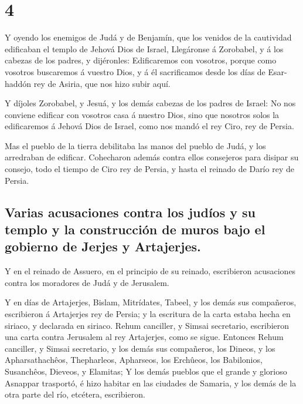 \hypertarget{section-3}{%
\section{4}\label{section-3}}

 Y oyendo los enemigos de Judá y de Benjamín, que los
venidos de la cautividad edificaban el templo de Jehová Dios de Israel,
 Llegáronse á Zorobabel, y á los cabezas de los padres, y
dijéronles: Edificaremos con vosotros, porque como vosotros buscaremos á
vuestro Dios, y á él sacrificamos desde los días de Esar-haddón rey de
Asiria, que nos hizo subir aquí.

 Y díjoles Zorobabel, y Jesuá, y los demás cabezas de los
padres de Israel: No nos conviene edificar con vosotros casa á nuestro
Dios, sino que nosotros solos la edificaremos á Jehová Dios de Israel,
como nos mandó el rey Ciro, rey de Persia.

 Mas el pueblo de la tierra debilitaba las manos del pueblo
de Judá, y los arredraban de edificar.  Cohecharon además
contra ellos consejeros para disipar su consejo, todo el tiempo de Ciro
rey de Persia, y hasta el reinado de Darío rey de Persia.

\hypertarget{varias-acusaciones-contra-los-juduxedos-y-su-templo-y-la-construcciuxf3n-de-muros-bajo-el-gobierno-de-jerjes-y-artajerjes.}{%
\subsection{Varias acusaciones contra los judíos y su templo y la
construcción de muros bajo el gobierno de Jerjes y
Artajerjes.}\label{varias-acusaciones-contra-los-juduxedos-y-su-templo-y-la-construcciuxf3n-de-muros-bajo-el-gobierno-de-jerjes-y-artajerjes.}}

 Y en el reinado de Assuero, en el principio de su reinado,
escribieron acusaciones contra los moradores de Judá y de Jerusalem.

 Y en días de Artajerjes, Bislam, Mitrídates, Tabeel, y los
demás sus compañeros, escribieron á Artajerjes rey de Persia; y la
escritura de la carta estaba hecha en siriaco, y declarada en siriaco.
 Rehum canciller, y Simsai secretario, escribieron una carta
contra Jerusalem al rey Artajerjes, como se sigue.  Entonces
Rehum canciller, y Simsai secretario, y los demás sus compañeros, los
Dineos, y los Apharsathachêos, Thepharleos, Apharseos, los Erchûeos, los
Babilonios, Susanchêos, Dieveos, y Elamitas;  Y los demás
pueblos que el grande y glorioso Asnappar trasportó, é hizo habitar en
las ciudades de Samaria, y los demás de la otra parte del río, etcétera,
escribieron.

